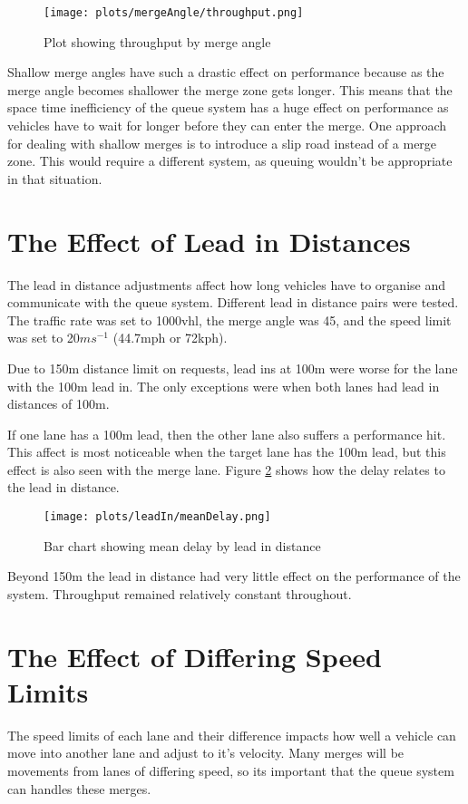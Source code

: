 \begin{figure}[htb]
\centering
\texttt{[image: plots/mergeAngle/throughput.png]}
\caption{Plot showing throughput by merge angle}
\label{fig:throughputMergeAngle}
\end{figure}

Shallow merge angles have such a drastic effect on performance because as the merge angle becomes shallower the merge zone gets longer. This means that the space time inefficiency of the queue system has a huge effect on performance as vehicles have to wait for longer before they can enter the merge. One approach for dealing with shallow merges is to introduce a slip road instead of a merge zone. This would require a different system, as queuing wouldn't be appropriate in that situation.

\section{The Effect of Lead in Distances}
\label{sec:The Effect of Lead in Distances}
The lead in distance adjustments affect how long vehicles have to organise and communicate with the queue system. Different lead in distance pairs were tested. The traffic rate was set to 1000\si{vhl}, the merge angle was 45\degree, and the speed limit was set to 20$\si{ms^{-1}}$ (44.7\si{mph} or 72\si{kph}).

Due to 150\si{m} distance limit on requests, lead ins at 100\si{m} were worse for the lane with the 100\si{m} lead in. The only exceptions were when both lanes had lead in distances of 100\si{m}.

If one lane has a 100\si{m} lead, then the other lane also suffers a performance hit. This affect is most noticeable when the target lane has the 100\si{m} lead, but this effect is also seen with the merge lane. Figure \ref{fig:meanDelayLeadIn} shows how the delay relates to the lead in distance.

\begin{figure}[p]
\centerline{
	\texttt{[image: plots/leadIn/meanDelay.png]}
}
\caption{Bar chart showing mean delay by lead in distance}
\label{fig:meanDelayLeadIn}
\end{figure}

Beyond 150\si{m} the lead in distance had very little effect on the performance of the system. Throughput remained relatively constant throughout.

\section{The Effect of Differing Speed Limits}
\label{sec:The Effect of Differing Speed Limits}
The speed limits of each lane and their difference impacts how well a vehicle can move into another lane and adjust to it's velocity. Many merges will be movements from lanes of differing speed, so its important that the queue system can handles these merges.

